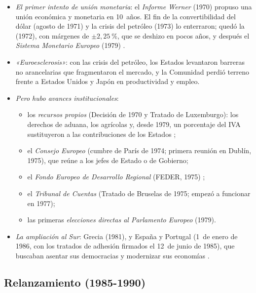 \documentclass[11pt]{article}
\begin{document}
\begin{itemize}
\item \emph{El primer intento de unión monetaria}: el \emph{Informe Werner} (1970) propuso una unión económica y monetaria en 10~años. El fin de la convertibilidad del dólar (agosto de 1971) y la crisis del petróleo (1973) lo enterraron; quedó la  (1972), con márgenes de $\pm2{,}25~\%$, que se deshizo en pocos años, y después el \emph{Sistema Monetario Europeo} (1979) .
\item \emph{«Euroesclerosis»}: con las crisis del petróleo, los Estados levantaron barreras no arancelarias que fragmentaron el mercado, y la Comunidad perdió terreno frente a Estados Unidos y Japón en productividad y empleo.
\item \emph{Pero hubo avances institucionales}:
  \begin{itemize}
  \item los \emph{recursos propios} (Decisión de 1970 y Tratado de Luxemburgo): los derechos de aduana, los agrícolas y, desde 1979, un porcentaje del IVA sustituyeron a las contribuciones de los Estados ;
  \item el \emph{Consejo Europeo} (cumbre de París de 1974; primera reunión en Dublín, 1975), que reúne a los jefes de Estado o de Gobierno;
  \item el \emph{Fondo Europeo de Desarrollo Regional} (FEDER, 1975) ;
  \item el \emph{Tribunal de Cuentas} (Tratado de Bruselas de 1975; empezó a funcionar en 1977);
  \item las primeras \emph{elecciones directas al Parlamento Europeo} (1979).
  \end{itemize}
\item \emph{La ampliación al Sur}: Grecia (1981), y España y Portugal (1~de enero de 1986, con los tratados de adhesión firmados el 12~de junio de 1985), que buscaban asentar sus democracias y modernizar sus economías .
\end{itemize}

\subsection{Relanzamiento (1985-1990)}\label{sec:relanzamiento}
\end{document}
